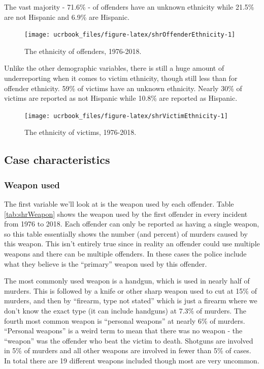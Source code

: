 \documentclass[
  12pt,
  openany]{book}
\begin{document}
The vast majority - 71.6\% - of offenders have an unknown ethnicity while 21.5\% are not Hispanic and 6.9\% are Hispanic.

\begin{figure}

{\centering \texttt{[image: ucrbook\_files/figure-latex/shrOffenderEthnicity-1]} 

}

\caption{The ethnicity of offenders, 1976-2018.}\label{fig:shrOffenderEthnicity}
\end{figure}

Unlike the other demographic variables, there is still a huge amount of underreporting when it comes to victim ethnicity, though still less than for offender ethnicity. 59\% of victims have an unknown ethnicity. Nearly 30\% of victims are reported as not Hispanic while 10.8\% are reported as Hispanic.

\begin{figure}

{\centering \texttt{[image: ucrbook\_files/figure-latex/shrVictimEthnicity-1]} 

}

\caption{The ethnicity of victims, 1976-2018.}\label{fig:shrVictimEthnicity}
\end{figure}

\hypertarget{case-characteristics}{%
\subsection{Case characteristics}\label{case-characteristics}}

\hypertarget{weapon-used}{%
\subsubsection{Weapon used}\label{weapon-used}}

The first variable we'll look at is the weapon used by each offender. Table \ref{tab:shrWeapon} shows the weapon used by the first offender in every incident from 1976 to 2018. Each offender can only be reported as having a single weapon, so this table essentially shows the number (and percent) of murders caused by this weapon. This isn't entirely true since in reality an offender could use multiple weapons and there can be multiple offenders. In these cases the police include what they believe is the ``primary'' weapon used by this offender.

The most commonly used weapon is a handgun, which is used in nearly half of murders. This is followed by a knife or other sharp weapon used to cut at 15\% of murders, and then by ``firearm, type not stated'' which is just a firearm where we don't know the exact type (it can include handguns) at 7.3\% of murders. The fourth most common weapon is ``personal weapons'' at nearly 6\% of murders. ``Personal weapons'' is a weird term to mean that there was no weapon - the ``weapon'' was the offender who beat the victim to death. Shotguns are involved in 5\% of murders and all other weapons are involved in fewer than 5\% of cases. In total there are 19 different weapons included though most are very uncommon.
\end{document}
